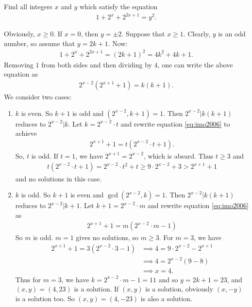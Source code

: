 \documentclass[problems.tex]{subfile}
\begin{document}
	\begin{problem}[IMO 2006]
		Find all integers $x$ and $y$ which satisfy the equation
		\begin{align*}
		1 + 2^x + 2^{2x + 1} = y^2.
		\end{align*}
	\end{problem}
	
	\begin{solution}
		Obviously, $x \ge 0$. If $x = 0$, then $y = \pm 2$. Suppose that $x \ge 1$. Clearly, $y$ is an odd number, so assume that $y = 2k + 1$. Now:
		\begin{align*}
		1 + 2^x + 2^{2x + 1} = (2k + 1)^2 = 4k^2 + 4k + 1.
		\end{align*}
		Removing $1$ from both sides and then dividing by $4$, one can write the above equation as
		\begin{align}\label{eq:imo2006}
		2^{x - 2}(2^{x + 1} + 1) = k(k + 1).
		\end{align}
		We consider two cases:
		\begin{enumerate}
			\item $k$ is even. So $k + 1$ is odd and $(2^{x - 2}, k + 1) = 1$. Then $2^{x - 2}|k(k + 1)$ reduces to $2^{x - 2}|k$. Let $k = 2^{x - 2} \cdot t$ and rewrite equation \eqref{eq:imo2006} to achieve
			\begin{align*}
			2^{x + 1} + 1 = t(2^{x - 2} \cdot t + 1).
			\end{align*}
			So, $t$ is odd. If $t = 1$, we have $2^{x + 1} = 2^{x - 2}$, which is absurd. Thus $t \ge 3$ and
			\begin{align*}
			t(2^{x - 2} \cdot t + 1) = 2^{x - 2} \cdot t^2 + t \ge 9 \cdot 2^{x - 2} + 3 > 2^{x + 1} + 1
			\end{align*}
			and no solutions in this case.
			
			\item $k$ is odd. So $k + 1$ is even and $\gcd(2^{x - 2}, k) = 1$. Then $2^{x - 2}|k(k + 1)$ reduces to $2^{x - 2}|k+1$. Let $k+1 = 2^{x - 2} \cdot m$ and rewrite equation \eqref{eq:imo2006} as
			\begin{align*}
			2^{x + 1} + 1 = m(2^{x - 2} \cdot m - 1)
			\end{align*}
			So $m$ is odd. $m = 1$ gives no solutions, so $m \ge 3$. For $m = 3$, we have
			\begin{align*}
			2^{x + 1} + 1 = 3(2^{x - 2} \cdot 3 - 1) &\implies 4 = 9 \cdot 2^{x - 2} - 2^{x + 1} \\
			&\implies 4 = 2^{x - 2}(9 - 8) \\
			&\implies x = 4.
			\end{align*}
			Thus for $m = 3$, we have $k = 2^{x - 2} \cdot m - 1 = 11$ and so $y = 2k + 1 = 23$, and $(x, y) = (4, 23)$ is a solution. If $(x, y)$ is a solution, obviously $(x, -y)$ is a solution too. So $(x, y) = (4, -23)$ is also a solution.
			

\end{enumerate}
\end{solution}
\end{document}
